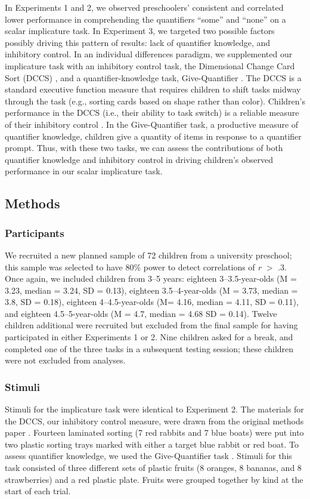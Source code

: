 \documentclass[man]{apa2}
\begin{document}
In Experiments 1 and 2, we observed preschoolers' consistent and correlated lower performance in comprehending the quantifiers ``some'' and ``none'' on a scalar implicature task. In Experiment 3, we targeted two possible factors possibly driving this pattern of results: lack of quantifier knowledge, and inhibitory control. In an individual differences paradigm, we supplemented our implicature task with an inhibitory control task, the Dimensional Change Card Sort (DCCS) \cite{zelazo2006}, and a quantifier-knowledge task, Give-Quantifier \cite{barner2009}. The DCCS is a standard executive function measure that requires children to shift tasks midway through the task (e.g., sorting cards based on shape rather than color). Children's performance in the DCCS (i.e., their ability to task switch) is a reliable measure of their inhibitory control \cite{zelazo2006}. In the Give-Quantifier task, a productive measure of quantifier knowledge, children give a quantity of items in response to a quantifier prompt. Thus, with these two tasks, we can assess the contributions of both quantifier knowledge and inhibitory control in driving children's observed performance in our scalar implicature task.

\subsection{Methods}
\subsubsection{Participants} We recruited a new planned sample of 72 children from a university preschool; this sample was selected to have 80\% power to detect correlations of \emph{r} $>$ .3. Once again, we included children from 3--5 years: eighteen 3--3.5-year-olds (M = 3.23, median = 3.24, SD = 0.13), eighteen 3.5--4-year-olds (M = 3.73, median = 3.8, SD = 0.18), eighteen 4--4.5-year-olds (M= 4.16, median = 4.11, SD = 0.11), and eighteen 4.5--5-year-olds (M = 4.7, median = 4.68 SD = 0.14). Twelve children additional were recruited but excluded from the final sample for having participated in either Experiments 1 or 2. Nine children asked for a break, and completed one of the three tasks in a subsequent testing session; these children were not excluded from analyses.

\subsubsection{Stimuli} Stimuli for the implicature task were identical to Experiment 2. The materials for the DCCS, our inhibitory control measure, were drawn from the original methods paper \cite{zelazo2006}. Fourteen laminated sorting (7 red rabbits and 7 blue boats) were put into two plastic sorting trays marked with either a target blue rabbit or red boat. To assess quantifier knowledge, we used the Give-Quantifier task \cite{barner2009}. Stimuli for this task consisted of three different sets of plastic fruits (8 oranges, 8 bananas, and 8 strawberries) and a red plastic plate. Fruits were grouped together by kind at the start of each trial. 
\end{document}
